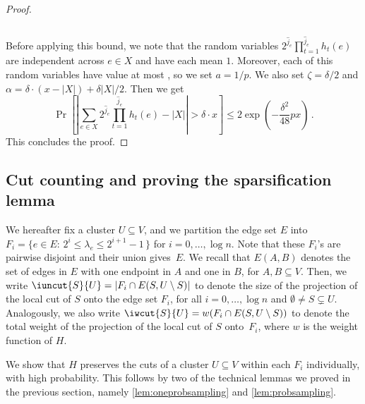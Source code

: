 \begin{proof}
\begin{fact}
\begin{equation*}
		\end{equation*}
	\end{fact}
	\noindent
	Before applying this bound, we note that the random variables $2^{\hat{j}_e}\prod_{t=1}^{\hat{j}_e}h_t(e)$ are independent across $e \in X$ and have each mean $1$. Moreover, each of this random variables have value at most , so we set $a = 1/p$. We also set $\zeta = \delta/2$ and $\alpha = \delta\cdot (x-|X|)+\delta|X|/2$. Then we get
	\begin{equation*}
		\Pr\left[\left|\sum_{e \in X} 2^{\hat{j}_e}\prod_{t=1}^{\hat{j}_e}h_t(e) - |X|\right| > \delta \cdot x \right] \le 2 \exp\left(-\frac{\delta^2}{48}px\right) \, .
	\end{equation*}
	This concludes the proof.
\end{proof}

\subsection{Cut counting and proving the sparsification lemma}
\label{subsec:cutcounting}
We hereafter fix a cluster $U\subseteq V$, and we partition the edge set $E$ into $F_i = \{e \in E: \, 2^i \le \lambda_e \le 2^{i+1} -1 \, \}$ for $i =0,\dots,\log n$. Note that these $F_i$'s are pairwise disjoint and their union gives~$E$. We recall that $E(A,B)$ denotes the set of edges in $E$ with one endpoint in $A$ and one in $B$, for $A,B \subseteq V$. Then, we write $\iuncut{S}{U}=|F_i \cap E(S,U \setminus S)|$ to denote the size of the projection of the local cut of $S$ onto the edge set $F_i$, for all $i=0,\dots, \log n$ and $\emptyset \neq S \subsetneq U$. Analogously, we also write $\iwcut{S}{U}=w(F_i \cap E(S,U \setminus S))$ to denote the total weight of the projection of the local cut of $S$ onto~$F_i$, where $w$ is the weight function of $H$.

We show that $H$ preserves the cuts of a cluster $U \subseteq V$ within each $F_i$ individually, with high probability. This follows by two of the technical lemmas we proved in the previous section, namely \cref{lem:oneprobsampling} and \cref{lem:probsampling}.

